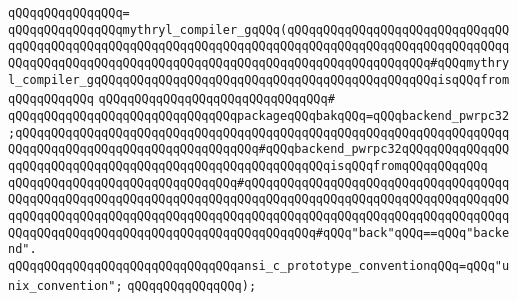 \verb|qQQqqQQqqQQqqQQq=|\newline
\verb|qQQqqQQqqQQqqQQqmythryl_compiler_gqQQq(qQQqqQQqqQQqqQQqqQQqqQQqqQQqqQQqqQQqqQQqqQQqqQQqqQQqqQQqqQQqqQQqqQQqqQQqqQQqqQQqqQQqqQQqqQQqqQQqqQQqqQQqqQQqqQQqqQQqqQQqqQQqqQQqqQQqqQQqqQQqqQQqqQQqqQQqqQQqqQQq#qQQqmythryl_compiler_gqQQqqQQqqQQqqQQqqQQqqQQqqQQqqQQqqQQqqQQqqQQqqQQqisqQQqfromqQQqqQQqqQQq|\newline
\verb|qQQqqQQqqQQqqQQqqQQqqQQqqQQqqQQq#|\newline
\verb|qQQqqQQqqQQqqQQqqQQqqQQqqQQqqQQqpackageqQQqbakqQQq=qQQqbackend_pwrpc32;qQQqqQQqqQQqqQQqqQQqqQQqqQQqqQQqqQQqqQQqqQQqqQQqqQQqqQQqqQQqqQQqqQQqqQQqqQQqqQQqqQQqqQQqqQQqqQQqqQQqqQQq#qQQqbackend_pwrpc32qQQqqQQqqQQqqQQqqQQqqQQqqQQqqQQqqQQqqQQqqQQqqQQqqQQqqQQqqQQqisqQQqfromqQQqqQQqqQQq|\newline
\verb|qQQqqQQqqQQqqQQqqQQqqQQqqQQqqQQq#qQQqqQQqqQQqqQQqqQQqqQQqqQQqqQQqqQQqqQQqqQQqqQQqqQQqqQQqqQQqqQQqqQQqqQQqqQQqqQQqqQQqqQQqqQQqqQQqqQQqqQQqqQQqqQQqqQQqqQQqqQQqqQQqqQQqqQQqqQQqqQQqqQQqqQQqqQQqqQQqqQQqqQQqqQQqqQQqqQQqqQQqqQQqqQQqqQQqqQQqqQQqqQQqqQQqqQQqqQQq#qQQq"back"qQQq==qQQq"backend".|\newline
\verb|qQQqqQQqqQQqqQQqqQQqqQQqqQQqqQQqansi_c_prototype_conventionqQQq=qQQq"unix_convention";|\newline
\verb|qQQqqQQqqQQqqQQq);|\newline

